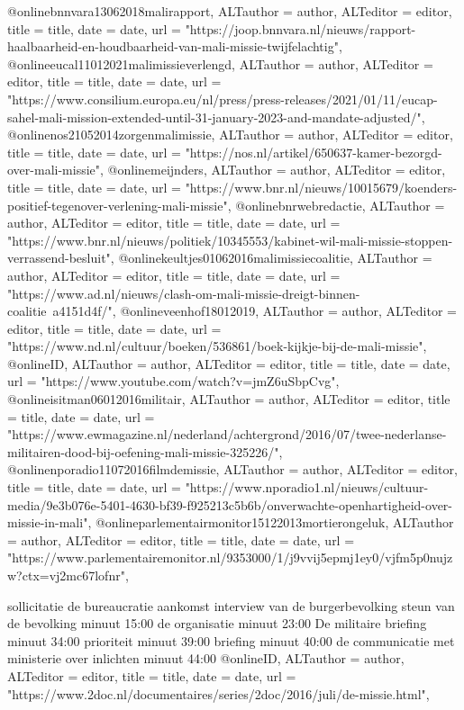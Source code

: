 {{{{{{{{{\cite{ovvMortierOngevalMaliVideo} 





@online{bnnvara13062018malirapport,	ALTauthor = {author},	ALTeditor = {editor},	title = {title},	date = {date},	url = {"https://joop.bnnvara.nl/nieuws/rapport-haalbaarheid-en-houdbaarheid-van-mali-missie-twijfelachtig"},}
@online{eucal11012021malimissieverlengd,	ALTauthor = {author},	ALTeditor = {editor},	title = {title},	date = {date},	url = {"https://www.consilium.europa.eu/nl/press/press-releases/2021/01/11/eucap-sahel-mali-mission-extended-until-31-january-2023-and-mandate-adjusted/"},}
@online{nos21052014zorgenmalimissie,	ALTauthor = {author},	ALTeditor = {editor},	title = {title},	date = {date},	url = {"https://nos.nl/artikel/650637-kamer-bezorgd-over-mali-missie"},}
@online{meijnders,	ALTauthor = {author},	ALTeditor = {editor},	title = {title},	date = {date},	url = {"https://www.bnr.nl/nieuws/10015679/koenders-positief-tegenover-verlening-mali-missie"},}
@online{bnrwebredactie,	ALTauthor = {author},	ALTeditor = {editor},	title = {title},	date = {date},	url = {"https://www.bnr.nl/nieuws/politiek/10345553/kabinet-wil-mali-missie-stoppen-verrassend-besluit"},}
@online{keultjes01062016malimissiecoalitie,	ALTauthor = {author},	ALTeditor = {editor},	title = {title},	date = {date},	url = {"https://www.ad.nl/nieuws/clash-om-mali-missie-dreigt-binnen-coalitie~a4151d4f/"},}
@online{veenhof18012019,	ALTauthor = {author},	ALTeditor = {editor},	title = {title},	date = {date},	url = {"https://www.nd.nl/cultuur/boeken/536861/boek-kijkje-bij-de-mali-missie"},}
@online{ID,	ALTauthor = {author},	ALTeditor = {editor},	title = {title},	date = {date},	url = {"https://www.youtube.com/watch?v=jmZ6uSbpCvg"},}
@online{isitman06012016militair,	ALTauthor = {author},	ALTeditor = {editor},	title = {title},	date = {date},	url = {"https://www.ewmagazine.nl/nederland/achtergrond/2016/07/twee-nederlanse-militairen-dood-bij-oefening-mali-missie-325226/"},}
@online{nporadio11072016filmdemissie,	ALTauthor = {author},	ALTeditor = {editor},	title = {title},	date = {date},	url = {"https://www.nporadio1.nl/nieuws/cultuur-media/9e3b076e-5401-4630-bf39-f925213c5b6b/onverwachte-openhartigheid-over-missie-in-mali"},}
@online{parlementairmonitor15122013mortierongeluk,	ALTauthor = {author},	ALTeditor = {editor},	title = {title},	date = {date},	url = {"https://www.parlementairemonitor.nl/9353000/1/j9vvij5epmj1ey0/vjfm5p0nujzw?ctx=vj2mc67lofnr"},}


sollicitatie
de bureaucratie
aankomst
interview van de burgerbevolking
steun van de bevolking minuut 15:00
de organisatie minuut 23:00
De militaire briefing minuut 34:00
prioriteit minuut 39:00
briefing minuut 40:00
de communicatie met ministerie over inlichten minuut 44:00
@online{ID,	ALTauthor = {author},	ALTeditor = {editor},	title = {title},	date = {date},	url = {"https://www.2doc.nl/documentaires/series/2doc/2016/juli/de-missie.html"},}










}}}}}}}}}
